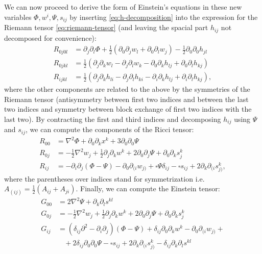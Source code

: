\documentclass[a4paper]{article}
\begin{document}
We can now proceed to derive the form of Einstein's equations in these new variables $\Phi, w^i, \Psi, s_{ij}$ by inserting \eqref{eq:h-decomposition} into the expression for the Riemann tensor \eqref{eq:riemann-tensor} (and leaving the spacial part $h_{ij}$ not decomposed for convenience):
\begin{subequations}
  \begin{align}
    R_{0j0l} &= \partial_j\partial_l\Phi + \frac{1}{2}(\partial_0\partial_j w_l + \partial_0\partial_l w_j) - \frac{1}{2}\partial_0 \partial_0 h_{jl}\\
    R_{0jkl} &= \frac{1}{2}\left(\partial_j\partial_k w_l - \partial_j\partial_l w_k - \partial_0 \partial_k h_{lj} + \partial_0 \partial_l h_{kj}\right)\\
    R_{ijkl} &= \frac{1}{2}\left(\partial_j \partial_k h_{li} - \partial_j \partial_l h_{ki} -\partial_i \partial_k h_{lj} + \partial_i \partial_l h_{kj}\right),
  \end{align}
\end{subequations}
where the other components are related to the above by the symmetries of the Riemann tensor (antisymmetry between first two indices and between the last two indices and symmetry between block exchange of first two indices with the last two). By contracting the first and third indices and decomposing $h_{ij}$ using $\Psi$ and $s_{ij}$, we can compute the components of the Ricci tensor:
\begin{subequations}
\begin{align}
R_{00} &= \nabla^2\Phi + \partial_0\partial_k x^k + 3\partial_0\partial_0\Psi\\
R_{0j} &= -\frac{1}{2}\nabla^2 w_j + \frac{1}{2} \partial_j \partial_k w^k + 2\partial_0\partial_j \Psi + \partial_0\partial_k s_j^k\\
R_{ij} &= -\partial_i\partial_j(\Phi - \Psi) - \partial_0 \partial_{(i}w_{j)} + \square\Psi\delta_{ij} - \square s_{ij} + 2\partial_k\partial_{(i}s_{j)}^k,
\end{align}
\end{subequations}
where the parentheses over indices stand for symmetrization i.e. $A_{(ij)} = \frac{1}{2}(A_{ij} + A_{ji})$.
Finally, we can compute the Einstein tensor:
\begin{subequations}\label{eq:g}
  \begin{align}
    G_{00} &= 2\nabla^2 \Psi + \partial_k \partial_l s^{kl} \label{eq:g00}\\
    G_{0j} &= -\frac{1}{2}\nabla^2 w_j + \frac{1}{2}\partial_j\partial_k w^k + 2\partial_0\partial_j \Psi + \partial_0 \partial_k s_j^k \label{eq:g0j}\\
    G_{ij} &= (\delta_{ij}\partial^2 - \partial_i\partial_j)(\Phi - \Psi) + \delta_{ij}\partial_0 \partial_k w^k - \partial_0 \partial_{(i}w_{j)} +\nonumber\\
    &\ \ \ \ + 2\delta_{ij}\partial_0\partial_0\Psi - \square s_{ij} + 2\partial_k \partial_{(i}s_{j)}^k - \delta_{ij} \partial_{k}\partial_l s^{kl} \label{eq:gij}
  \end{align}
\end{subequations}
\end{document}
